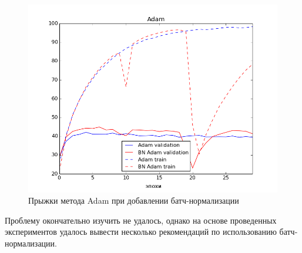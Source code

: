 \documentclass[12pt]{article}
\begin{document}
\begin{figure}[h!]
\centering
\includegraphics[scale=0.7]{adam_shallow.png}
\caption{\small Прыжки метода Adam при добавлении батч-нормализации} \label{fig:adam}
\end{figure}

Проблему окончательно изучить не удалось, однако на основе проведенных экспериментов удалось вывести несколько рекомендаций по использованию батч-нормализации.
\end{document}
